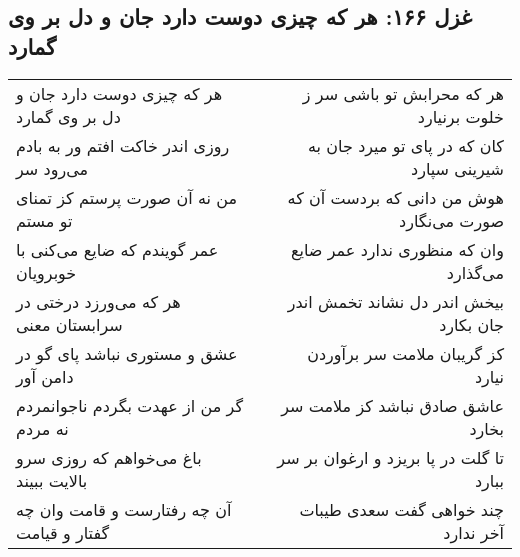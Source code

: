 \begin{center}
\section*{غزل ۱۶۶: هر که چیزی دوست دارد جان و دل بر وی گمارد}
\label{sec:166}
\begin{longtable}{l p{0.5cm} r}
هر که چیزی دوست دارد جان و دل بر وی گمارد
&&
هر که محرابش تو باشی سر ز خلوت برنیارد
\\
روزی اندر خاکت افتم ور به بادم می‌رود سر
&&
کان که در پای تو میرد جان به شیرینی سپارد
\\
من نه آن صورت پرستم کز تمنای تو مستم
&&
هوش من دانی که بردست آن که صورت می‌نگارد
\\
عمر گویندم که ضایع می‌کنی با خوبرویان
&&
وان که منظوری ندارد عمر ضایع می‌گذارد
\\
هر که می‌ورزد درختی در سرابستان معنی
&&
بیخش اندر دل نشاند تخمش اندر جان بکارد
\\
عشق و مستوری نباشد پای گو در دامن آور
&&
کز گریبان ملامت سر برآوردن نیارد
\\
گر من از عهدت بگردم ناجوانمردم نه مردم
&&
عاشق صادق نباشد کز ملامت سر بخارد
\\
باغ می‌خواهم که روزی سرو بالایت ببیند
&&
تا گلت در پا بریزد و ارغوان بر سر ببارد
\\
آن چه رفتارست و قامت وان چه گفتار و قیامت
&&
چند خواهی گفت سعدی طیبات آخر ندارد
\\
\end{longtable}
\end{center}
